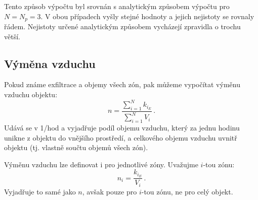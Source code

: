 Tento způsob výpočtu byl srovnán s analytickým způsobem výpočtu pro $N=N_p=3$. V obou případech vyšly stejné hodnoty a jejich nejistoty se rovnaly řádem. Nejistoty určené analytickým způsobem vycházejí zpravidla o trochu větší.
\subsection{Výměna vzduchu}
Pokud známe exfiltrace a objemy všech zón, pak můžeme vypočítat výměnu vzduchu objektu:
\begin{equation}
    n=\frac{\sum_{i=1}^N k_{i_E}}{\sum_{i=1}^N V_i}\,.
    \label{eq:prutoky_n}
\end{equation}
Udává se v \si{1/hod} a vyjadřuje podíl objemu vzduchu, který za jednu hodinu unikne z objektu do vnějšího prostředí, a celkového objemu vzduchu uvnitř objektu (tj. vlastně součtu objemů všech zón).

Výměnu vzduchu lze definovat i pro jednotlivé zóny. Uvažujme $i$-tou zónu:
\begin{equation}
    n_i=\frac{k_{i_E}}{V_i}\,.
    \label{eq:prutoky_n_jednaZona}
\end{equation}
Vyjadřuje to samé jako $n$, avšak pouze pro $i$-tou zónu, ne pro celý objekt.
